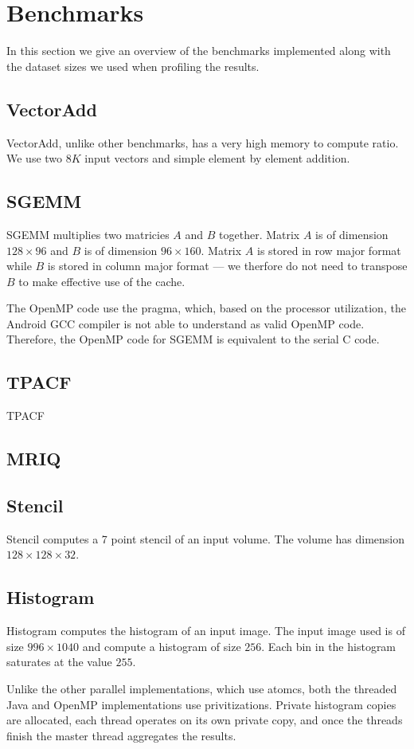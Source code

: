 \section{Benchmarks}

In this section we give an overview of the benchmarks implemented along with 
	the dataset sizes we used when profiling the results.

\subsection{VectorAdd}

VectorAdd, unlike other benchmarks, has a very high memory to compute ratio.
We use two $8K$ input vectors and simple element by element addition.

\subsection{SGEMM}


SGEMM multiplies two matricies $A$ and $B$ together.
Matrix $A$ is of dimension $128 \times 96$ and $B$ is of dimension $96 \times 160$.
Matrix $A$ is stored in row major format while $B$ is stored in column major format --- we therfore do not need to transpose $B$ to make effective use of the cache.

The OpenMP code use the  pragma, which, based on the processor utilization, the Android GCC compiler is not able to understand as valid OpenMP code.
Therefore, the OpenMP code for SGEMM is equivalent to the serial C code.

\subsection{TPACF}

TPACF 

\subsection{MRIQ}



\subsection{Stencil}

Stencil computes a 7 point stencil of an input volume. 
The volume has dimension $128 \times 128 \times 32$.

\subsection{Histogram}

Histogram computes the histogram of an input image.
The input image used is of size $996 \times 1040$ and compute a 
	histogram of size $256$.
Each bin in the histogram saturates at the value $255$.

Unlike the other parallel implementations, which use atomcs, both the
	threaded Java and OpenMP implementations use privitizations.
Private histogram copies are allocated, each thread 
	operates on its own private copy, and once the threads finish the
	master thread aggregates the results.

